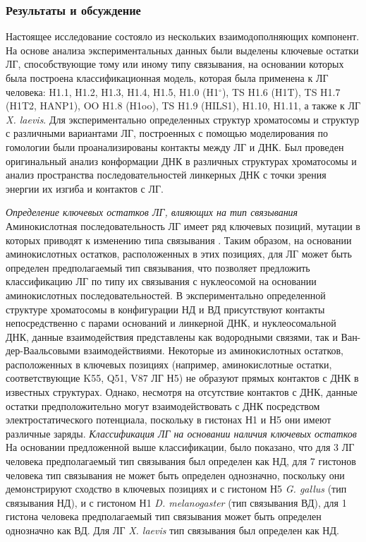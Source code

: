 \subsubsection{Результаты и обсуждение}
Настоящее исследование состояло из нескольких взаимодополняющих компонент. На основе анализа экспериментальных данных были выделены ключевые остатки ЛГ, способствующие тому или иному типу связывания, на основании которых была построена классификационная модель, которая была применена к ЛГ человека: H1.1, H1.2, H1.3, H1.4, H1.5, H1.0 (H1$^\circ$), TS H1.6 (H1T), TS H1.7 (H1T2, HANP1), OO H1.8 (H1oo), TS H1.9 (HILS1), H1.10, H1.11, а также к ЛГ \textit{X. laevis}. Для экспериментально определенных структур хроматосомы и структур с различными вариантами ЛГ, построенных с помощью моделирования по гомологии были проанализированы контакты между ЛГ и ДНК. Был проведен оригинальный анализ конформации ДНК в различных структурах хроматосомы и анализ пространства последовательностей линкерных ДНК с точки зрения энергии их изгиба и контактов с ЛГ. 

\emph{Определение ключевых остатков ЛГ, влияющих на тип связывания}
Аминокислотная последовательность ЛГ имеет ряд ключевых позиций, мутации в которых приводят к изменению типа связывания \cite{zhou_small_2016}. Таким образом, на основании аминокислотных остатков, расположенных в этих позициях, для ЛГ может быть определен предполагаемый тип связывания, что позволяет предложить классификацию ЛГ по типу их связывания с нуклеосомой на основании аминокислотных последовательностей. 
В экспериментально определенной структуре хроматосомы в конфигурации НД и ВД присутствуют контакты непосредственно с парами оснований и линкерной ДНК, и нуклеосомальной ДНК, данные взаимодействия представлены как водородными связями, так и Ван-дер-Ваальсовыми взаимодействиями. 
Некоторые из аминокислотных остатков, расположенных в ключевых позициях (например, аминокислотные остатки, соответствующие K55, Q51, V87 ЛГ Н5) не образуют прямых контактов с ДНК в известных структурах. Однако, несмотря на отсутствие контактов с ДНК, данные остатки предположительно могут взаимодействовать с ДНК посредством электростатического потенциала, поскольку в гистонах Н1 и Н5 они имеют различные заряды.
\emph{Классификация ЛГ на основании наличия ключевых остатков}
На основании предложенной выше классификации, было показано, что для 3 ЛГ человека предполагаемый тип связывания был определен как НД, для 7 гистонов человека тип связывания не может быть определен однозначно, поскольку они демонстрируют сходство в ключевых позициях и с гистоном Н5 \textit{G. gallus} (тип связывания НД), и с гистоном Н1 \textit{D. melanogaster} (тип связывания ВД), для 1 гистона человека предполагаемый тип связывания может быть определен однозначно как ВД. Для ЛГ \textit{X. laevis} тип связывания был определен как НД. 

